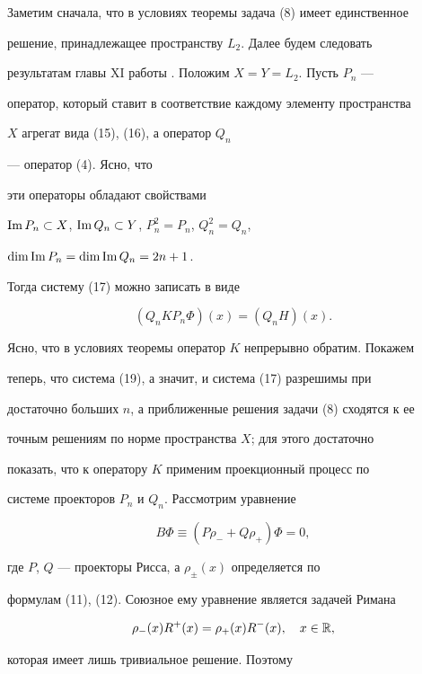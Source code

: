 \begin{pf} 


Заметим сначала, что в условиях теоремы задача (8) имеет единственное 


решение, принадлежащее пространству $L_2$. Далее будем следовать 


результатам главы XI работы \cite{8}. Положим $X=Y=L_2$. Пусть $P_n$ --- 


оператор, который ставит в соответствие каждому элементу пространства 


$X$ агрегат вида (15), (16), а оператор $Q_n$ 


--- оператор (4). Ясно, что 


эти операторы обладают свойствами 


$\operatorname{Im} P_n\subset X$, $\operatorname{Im} Q_n\subset Y$, $P^2_n=P_n$, $Q^2_n=Q_n$, 


$\dim\operatorname{Im} P_n=\dim\operatorname{Im} Q_n=2n+1$. 


Тогда систему (17) можно записать в виде 


\begin{equation} 


(Q_n K P_n\Phi)(x)=(Q_n H)(x). 


\end{equation} 


Ясно, что в условиях теоремы оператор $K$ непрерывно обратим. Покажем 


теперь, что система (19), а значит, и система (17) разрешимы при 


достаточно больших $n$, а приближенные решения задачи (8) сходятся к ее 


точным решениям по норме пространства $X$; для этого достаточно 


показать, что к оператору $K$ применим \cite{8} проекционный процесс по 


системе проекторов $P_n$ и $Q_n$. Рассмотрим уравнение 


$$ 


B\Phi\equiv(P\rho_-+Q\rho_+)\Phi=0, 


$$ 


где $P$, $Q$ --- проекторы Рисса, а $\rho_\pm(x)$ определяется по 


формулам (11), (12). Союзное ему уравнение является задачей Римана 


$$ 


\rho_-(x)R^+(x)=\rho_+(x)R^-(x),\quad x\in\Bbb R, 


$$ 


которая \cite{7} имеет лишь тривиальное решение. Поэтому 



\end{pf}
